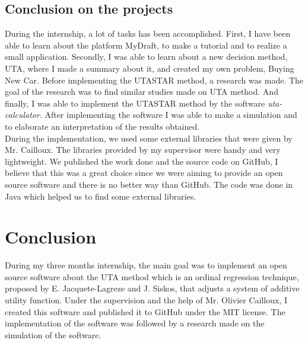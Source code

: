 \documentclass{report}
\begin{document}
\section{Conclusion on the projects}
During the internship, a lot of tasks has been accomplished. First, I have been able to learn about the platform MyDraft, to make a tutorial and to realize a small application. Secondly, I was able to learn about a new decision method, UTA, where I made a summary about it, and created my own problem, Buying New Car. Before implementing the UTASTAR method, a research was made. The goal of the research was to find similar studies made on UTA method. And finally, I was able to implement the UTASTAR method by the software \textit{uta-calculator}. After implementing the software I was able to make a simulation and to elaborate an interpretation of the results obtained. \\

During the implementation, we used some external libraries that were given by Mr. Cailloux. The libraries provided by my supervisor were handy and very lightweight. We published the work done and the source code on GitHub, I believe that this was a great choice since we were aiming to provide an open source software and there is no better way than GitHub. The code was done in Java which helped us to find some external libraries.\\

\chapter{Conclusion}
During my three months internship, the main goal was to implement an open source software about the UTA method which is an ordinal regression technique, proposed by E. Jacquete-Lagreze and J. Siskos, that adjusts a system of additive utility function. Under the supervision and the help of Mr. Olivier Cailloux, I created this software and published it to GitHub under the MIT license. The implementation of the software was followed by a research made on the simulation of the software.\\
\end{document}
